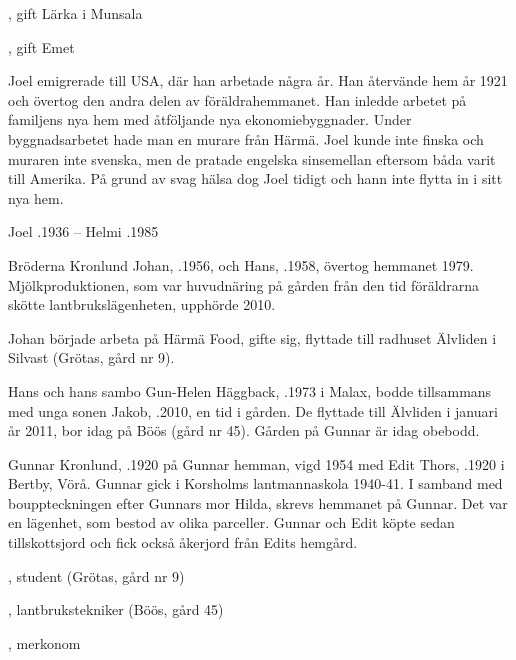 \begin{jhchildren}
  \item {}, gift Lärka i Munsala
  \item {}
  \item {}, gift Emet
\end{jhchildren}

Joel emigrerade till USA, där han arbetade några år. Han återvände hem år 1921 och övertog den andra delen av föräldrahemmanet. Han inledde arbetet på familjens nya hem med åtföljande nya ekonomiebyggnader. Under byggnadsarbetet hade man en murare från Härmä. Joel kunde inte finska och muraren inte svenska, men de pratade engelska sinsemellan eftersom båda varit till Amerika. På grund av svag hälsa dog Joel tidigt och hann inte flytta in i sitt nya hem.

Joel .1936  --  Helmi .1985






Bröderna Kronlund Johan, .1956, och Hans, .1958, övertog hemmanet 1979. Mjölkproduktionen, som var huvudnäring på gården från den tid föräldrarna skötte lantbrukslägenheten, upphörde 2010.

Johan började arbeta på Härmä Food, gifte sig, flyttade till radhuset Älvliden i Silvast (Grötas, gård nr 9).

Hans och hans sambo Gun-Helen Häggback, .1973 i Malax, bodde tillsammans med unga sonen Jakob, .2010, en tid i gården. De flyttade till Älvliden i januari år 2011, bor idag på Böös (gård nr 45). Gården på Gunnar är idag obebodd.


Gunnar Kronlund, .1920 på Gunnar hemman, vigd 1954 med Edit Thors, .1920 i Bertby, Vörå. Gunnar gick i Korsholms lantmannaskola 1940-41. I samband med bouppteckningen efter Gunnars mor Hilda, skrevs hemmanet på Gunnar. Det var en lägenhet, som bestod av olika parceller. Gunnar och Edit köpte sedan tillskottsjord och fick också åkerjord från Edits hemgård.

\begin{jhchildren}
  \item {}, student (Grötas, gård nr 9)
  \item {}, lantbrukstekniker (Böös, gård 45)
  \item {}, merkonom
\end{jhchildren}

